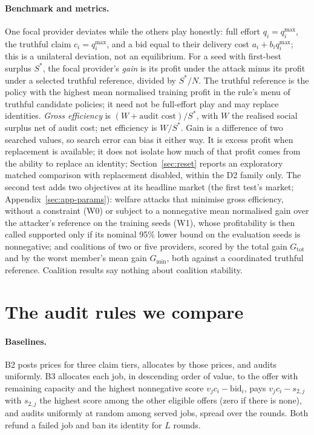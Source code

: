 \documentclass[11pt]{article}
\begin{document}
\paragraph{Benchmark and metrics.} One focal provider deviates while the others play honestly: full effort $q_i = q^{\max}_i$, the truthful claim $c_i = q^{\max}_i$, and a bid equal to their delivery cost $a_i + b_i q^{\max}_i$; this is a unilateral deviation, not an equilibrium. For a seed with first-best surplus $S^*$, the focal provider's \emph{gain} is its profit under the attack minus its profit under a selected truthful reference, divided by $S^*/N$. The truthful reference is the policy with the highest mean normalised training profit in the rule's menu of truthful candidate policies; it need not be full-effort play and may replace identities. \emph{Gross efficiency} is $(W + \text{audit cost})/S^*$, with $W$ the realised social surplus net of audit cost; net efficiency is $W/S^*$. Gain is a difference of two searched values, so search error can bias it either way. It is excess profit when replacement is available; it does not isolate how much of that profit comes from the ability to replace an identity; Section~\ref{sec:reset} reports an exploratory matched comparison with replacement disabled, within the D2 family only. The second test adds two objectives at its headline market (the first test's market; Appendix~\ref{sec:app-params}): welfare attacks that minimise gross efficiency, without a constraint (W0) or subject to a nonnegative mean normalised gain over the attacker's reference on the training seeds (W1), whose profitability is then called supported only if its nominal 95\% lower bound on the evaluation seeds is nonnegative; and coalitions of two or five providers, scored by the total gain $G_{\mathrm{tot}}$ and by the worst member's mean gain $G_{\min}$, both against a coordinated truthful reference. Coalition results say nothing about coalition stability.

\section{The audit rules we compare}\label{sec:rules}
\paragraph{Baselines.} B2 posts prices for three claim tiers, allocates by those prices, and audits uniformly. B3 allocates each job, in descending order of value, to the offer with remaining capacity and the highest nonnegative score $v_j c_i - \mathrm{bid}_i$, pays $v_j c_i - s_{2,j}$ with $s_{2,j}$ the highest score among the other eligible offers (zero if there is none), and audits uniformly at random among served jobs, spread over the rounds. Both refund a failed job and ban its identity for $L$ rounds.
\end{document}
